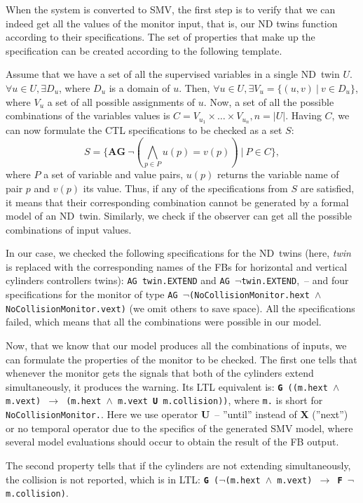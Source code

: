 \begin{bibunit}
When the system is converted to SMV, the first step is to verify that we can indeed get all the values of the monitor input, that is, our ND twins function according to their specifications. The set of properties that make up the specification can be created according to the following template. 

Assume that we have a set of all the supervised variables in a single ND~twin $U$.
$\forall u \in U, \exists D_u$, where $D_u$ is a domain of $u$. Then, $\forall u \in U, \exists V_u = \{(u,v) \:|\: v \in D_u\}$, where $V_u$ a set of all possible assignments of $u$. Now, a set of all the possible combinations of the variables values is $C = V_{u_1}\times\ldots\times V_{u_n}, n = |U|$. Having $C$, we can now formulate the CTL specifications to be checked as a set $S$:
$$S = \{\textbf{AG} \:\neg(\bigwedge_{p \in P} u(p) = v(p)) \:|\: P \in C\},$$
where $P$ a set of variable and value pairs, $u(p)$ returns the variable name of pair $p$ and $v(p)$ its value. Thus, if any of the specifications from $S$ are satisfied, it means that their corresponding combination cannot be generated by a formal model of an ND~twin.
Similarly, we check if the observer can get all the possible combinations of input values.

In our case, we checked the following specifications for the ND~twins (here, \emph{twin} is replaced with the corresponding names of the FBs for horizontal and vertical cylinders controllers twins): \texttt{AG twin.EXTEND} and \texttt{AG $\neg$twin.EXTEND},~-- and four specifications for the monitor of type \texttt{AG $\neg$(NoCollisionMonitor.hext $\land$ NoCollisionMonitor.vext)} (we omit others to save space). All the specifications failed, which means that all the combinations were possible in our model. 

Now, that we know that our model produces all the combinations of inputs, we can formulate the properties of the monitor to be checked. The first one tells that whenever the monitor gets the signals that both of the cylinders extend simultaneously, it produces the warning. Its LTL equivalent is: \texttt{\textbf{G} ((m.hext $\land$ m.vext) $\rightarrow$ (m.hext $\land$ m.vext \textbf{U} m.collision))}, where \texttt{m.} is short for \texttt{NoCollisionMonitor.}. Here we use operator \textbf{U}~-- ''until'' instead of \textbf{X} (''next'') or no temporal operator due to the specifics of the generated SMV model, where several model evaluations should occur to obtain the result of the FB output.

The second property tells that if the cylinders are not extending simultaneously, the collision is not reported, which is in LTL: \texttt{\textbf{G} ($\neg$(m.hext $\land$ m.vext) $\rightarrow$ \textbf{F} $\neg$ m.collision)}.


\end{bibunit}
